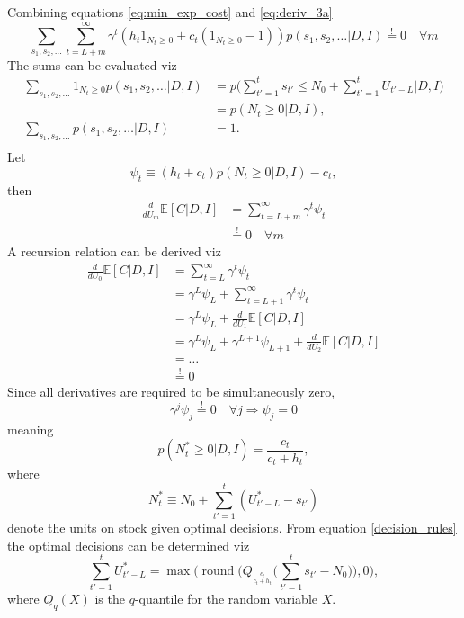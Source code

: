 Combining equations \eqref{eq:min_exp_cost} and \eqref{eq:deriv_3a}
\begin{equation}
	\sum_{s_1,s_2,\dots}\sum_{t=L+m}^{\infty}\gamma^{t}(h_t1_{N_{t}\geq 0}+c_t(1_{N_{t}\geq 0}-1))p(s_1,s_{2},\dots|D,I)\overset{!}{=} 0\quad \forall m
\end{equation}
The sums can be evaluated viz
\begin{equation}
	\begin{split}
		\sum_{s_1,s_2,\dots}1_{N_{t}\geq 0}p(s_1,s_{2},\dots|D,I) &= p\bigg(\sum_{t'=1}^{t}s_{t'}\leq N_0+\sum_{t'=1}^{t}U_{t'-L}|D,I\bigg)\\
		&= p(N_t\geq 0|D,I),\\
		\sum_{s_1,s_2,\dots}p(s_1,s_{2},\dots|D,I)&=1.\\
	\end{split}
\end{equation}
Let
\begin{equation}
	\psi_t\equiv (h_t+c_t)p(N_t\geq 0|D,I)-c_t,
\end{equation} 
then
\begin{equation}
	\begin{split}
		\frac{d}{dU_m}\mathbb{E}[C|D,I]& = \sum_{t=L+m}^{\infty}\gamma^{t}\psi_t\\
		&\overset{!}{=} 0\quad \forall m
	\end{split}
\end{equation}
A recursion relation can be derived viz
\begin{equation}
	\begin{split}
		\frac{d}{dU_0}\mathbb{E}[C|D,I] & = \sum_{t=L}^{\infty}\gamma^{t}\psi_t\\
		& =\gamma^{L}\psi_L+\sum_{t=L+1}^{\infty}\gamma^{t}\psi_t\\
		& =\gamma^{L}\psi_L+\frac{d}{dU_1}\mathbb{E}[C|D,I]\\
		& =\gamma^{L}\psi_L+\gamma^{L+1}\psi_{L+1}+\frac{d}{dU_2}\mathbb{E}[C|D,I]\\
		&=\dots\\
		&\overset{!}{=} 0
	\end{split} 
\end{equation}
Since all derivatives are required to be simultaneously zero,
\begin{equation}
	\gamma^{j}\psi_j\overset{!}{=} 0\quad \forall j \Rightarrow \psi_j=0
\end{equation}
meaning
\begin{equation}
	p(N_t^*\geq 0|D,I)=\frac{c_t}{c_t+h_t},
	\label{decision_rules}
\end{equation}
where
\begin{equation}
	N_t^*\equiv N_0+\sum_{t'=1}^{t}(U_{t'-L}^*-s_{t'})
\end{equation}
denote the units on stock given optimal decisions. From equation \eqref{decision_rules} the optimal decisions can be determined viz
\begin{equation}
	\sum_{t'=1}^{t}U_{t'-L}^* = \max\bigg(\operatorname{round}\bigg(Q_{\frac{c_t}{c_t+h_t}}\bigg(\sum_{t'=1}^{t}s_{t'}-N_0\bigg)\bigg),0\bigg),
\end{equation}
where $Q_q(X)$ is the $q$-quantile for the random variable $X$.